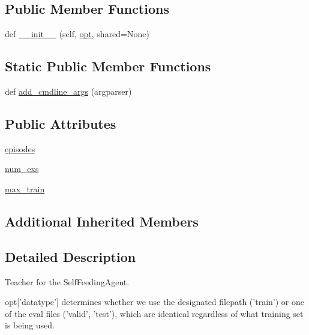 \subsection*{Public Member Functions}
\begin{DoxyCompactItemize}
\item 
def \hyperlink{classparlai_1_1tasks_1_1self__feeding_1_1agents_1_1SelfFeedingTeacher_ab0ab36e04c55553c03a77c049ae72a43}{\+\_\+\+\_\+init\+\_\+\+\_\+} (self, \hyperlink{classparlai_1_1core_1_1agents_1_1Teacher_a3ce6243860ce978a897922863ed32fa4}{opt}, shared=None)
\end{DoxyCompactItemize}
\subsection*{Static Public Member Functions}
\begin{DoxyCompactItemize}
\item 
def \hyperlink{classparlai_1_1tasks_1_1self__feeding_1_1agents_1_1SelfFeedingTeacher_a07b3ffdd16baf2b93be5e87e11f6745c}{add\+\_\+cmdline\+\_\+args} (argparser)
\end{DoxyCompactItemize}
\subsection*{Public Attributes}
\begin{DoxyCompactItemize}
\item 
\hyperlink{classparlai_1_1tasks_1_1self__feeding_1_1agents_1_1SelfFeedingTeacher_a63dea9aaa22e209cc87ef89a58e1b47f}{episodes}
\item 
\hyperlink{classparlai_1_1tasks_1_1self__feeding_1_1agents_1_1SelfFeedingTeacher_a6f2bcfa23af24a60b672b9ec368c09ff}{num\+\_\+exs}
\item 
\hyperlink{classparlai_1_1tasks_1_1self__feeding_1_1agents_1_1SelfFeedingTeacher_ad3868ed012b1209fa330702147ed85b9}{max\+\_\+train}
\end{DoxyCompactItemize}
\subsection*{Additional Inherited Members}


\subsection{Detailed Description}
\begin{DoxyVerb}Teacher for the SelfFeedingAgent.

opt['datatype'] determines whether we use the designated filepath ('train') or one
of the eval files ('valid', 'test'), which are identical regardless of     what
training set is being used.
\end{DoxyVerb}
 

